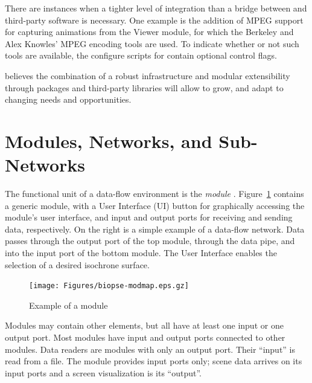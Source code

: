 There are instances when a tighter level of integration than a bridge
between \SR{} and third-party software is necessary.  One example is
the addition of MPEG support for capturing animations from the \SR{}
Viewer module, for which the Berkeley and Alex Knowles' MPEG encoding
tools are used.  To indicate whether or not such tools are available,
the configure scripts for \SR{} contain optional control flags.

\sci{} believes the combination of a robust infrastructure and modular
extensibility through packages and third-party libraries will allow \SR{}
to grow, and adapt to changing needs and opportunities. 



\section{\SR{} Modules, Networks, and Sub-Networks}
\label{sec:con-modules} 

\newcommand{\basicmodule}{%
  \centerline{\texttt{[image: Figures/biopse-modmap.eps.gz]}}
}
\begin{htmlonly}
  \newcommand{\basicmodule}{%
  \htmladdimg[align=top,width=766,alt="module"]
  {../Figures/biopse-modmap.gif}}
\end{htmlonly}

The functional unit of a data-flow environment is the {\em\/module}
.  Figure~\ref{fig:conc-module} contains a generic \SR{}
module, with a User Interface (UI) button for graphically accessing the
module's user interface, and input and output ports for receiving and sending
data, respectively.  On the right is a simple example of a data-flow
network.  Data passes through the output port of the top module, through
the data pipe, and into the input port of the bottom module.  The User
Interface enables the selection of a desired isochrone surface.

\begin{figure}[htb]
  \begin{makeimage}
  \end{makeimage}
  \basicmodule
  \caption{\label{fig:conc-module} Example of a \SR{} module}
\end{figure}

Modules may contain other elements, but all have at least one input or
one output port. Most modules have input and output ports connected to
other modules.  Data readers are modules with only an output port.
Their ``input'' is read from a file.  The
 module provides input
ports only; scene data arrives on its input ports and a screen
visualization is its ``output''.  

